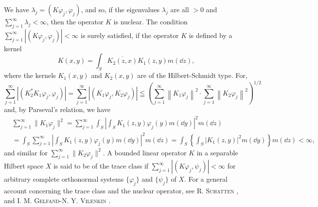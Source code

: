 We have $\lambda_{j} = (K\varphi_{j},\varphi_{j})$, and so, if the eigenvalues $\lambda_{j}$ are all $>0$ and $\sum\limits_{j=1}^{\infty}\lambda_{j}<\infty$, then the operator $K$ is nuclear. The condition $\sum\limits_{j=1}^{\infty}|(K\varphi_{j},\varphi_{j})|<\infty$ is surely satisfied, if the operator $K$ is defined by a kernel 
\[
K(x,y)=\int_S\overline{K_2(z,x)}K_1(z,y)m(\dd z),
\]
where the kernels $K_1(x,y)$ and $K_2(x,y)$ are of the Hilbert-Schmidt type.
For,
\[
\sum\limits_{j=1} ^{\infty} \left| \left(K _{2} ^{*} K _{1} \varphi_{j}, \varphi_{j}\right) \right| = \sum\limits_{j=1} ^{\infty} \left| \left(K _{1} \varphi_{j}, K _{2} \varphi_{j}\right) \right| \leqq \left(\sum\limits_{j=1} ^{\infty} \left\| K _{1} \varphi_{j} \right\| ^{2} \cdot \sum\limits_{j=1} ^{\infty} \left\| K _{2} \varphi_{j} \right\| ^{2}\right) ^{1/2}
\]
and, by Parseval's relation, we have 
\[
\begin{aligned}
&\sum\limits_{j=1} ^{\infty} \| K _{1} \varphi_{j} \| ^{2}  = \sum\limits_{j=1} ^{\infty} \int_{S} \left| \int_{S} K _{1} (z, y) \varphi_{j} (y) m (\dd y) \right| ^{2} m (\dd z) \\
&= \int_{S} \sum\limits_{j=1} ^{\infty} \left| \int_{S} K _{1} (z, y) \varphi_{j} (y) m (\dd y) \right| ^{2} m (\dd z) = \int_{S} \left\{\int_{S} | K _{1} (z, y) | ^{2} m (\dd y) \right\} m (\dd z) < \infty ,
\end{aligned}
\]
and similar for $\sum\limits_{j=1}^{\infty} \|K_2\varphi_j\|^2$. A bounded linear operator $K$ in a separable Hilbert space $X$ is said to be of the trace class if $\sum\limits_{j=1}^{\infty} |(K\varphi_j, \psi_j)| < \infty$ for arbitrary complete orthonormal systems $\{\varphi_j\}$ and $\{\psi_j\}$ of $X$. For a general account concerning the trace class and the nuclear operator, see R. \textsc{Schatten} \cite{schatten288}, and I. M. \textsc{Gelfand}-N. Y. \textsc{Vilenkin} \cite{gelfand77}. 


\label{sec:X.3}

